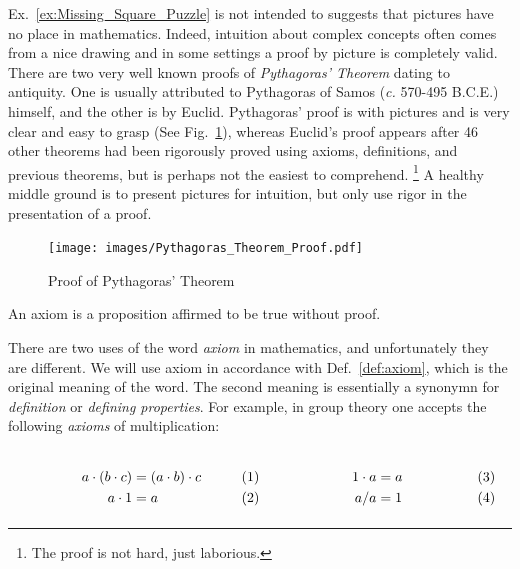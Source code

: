         Ex.~\ref{ex:Missing_Square_Puzzle} is not intended to suggests that
        pictures have no place in mathematics. Indeed, intuition about complex
        concepts often comes from a nice drawing and in some settings a proof by
        picture is completely valid. There are two very well known proofs of
        \textit{Pythagoras' Theorem}%
         dating to antiquity. One is usually
        attributed to Pythagoras of Samos (\textit{c.} 570-495 B.C.E.) himself,
        and the other is by Euclid. Pythagoras' proof is with pictures and is
        very clear and easy to grasp
        (See Fig.~\ref{fig:Proof_Pythagoras_Theorem}), whereas Euclid's proof
        appears after 46 other theorems had been rigorously proved using
        axioms, definitions, and previous theorems, but is perhaps not the
        easiest to comprehend.%
        \footnote{%
            The proof is not hard, just laborious.
        }
        A healthy middle ground is to present pictures for intuition, but only
        use rigor in the presentation of a proof.
        \begin{figure}
            \centering
            \captionsetup{type=figure}
            \texttt{[image: images/Pythagoras\_Theorem\_Proof.pdf]}
            \caption{Proof of Pythagoras' Theorem}
            \label{fig:Proof_Pythagoras_Theorem}
        \end{figure}
        \begin{definition}
            \label{def:axiom}%
            An \gls{axiom} is a \gls{proposition} affirmed to be true
            without \gls{proof}.
        \end{definition}
        There are two uses of the word \textit{axiom} in mathematics, and
        unfortunately they are different. We will use axiom in accordance with
        Def.~\ref{def:axiom}, which is the original meaning of the word. The
        second meaning is essentially a synonymn for \textit{definition} or
        \textit{defining properties}. For example, in group theory one accepts
        the following \textit{axioms} of multiplication:
        \par
        \begin{subequations}
            \begin{minipage}[b]{0.49\textwidth}
                \begin{align}
                    a\cdot(b\cdot{c})&=(a\cdot{b})\cdot{c}\\
                    a\cdot{1}&=a
                \end{align}
            \end{minipage}
            \hfill
            \begin{minipage}[b]{0.49\textwidth}
                \begin{align}
                    1\cdot{a}&=a\\
                    a/a&=1
                \end{align}
            \end{minipage}
        \end{subequations}
